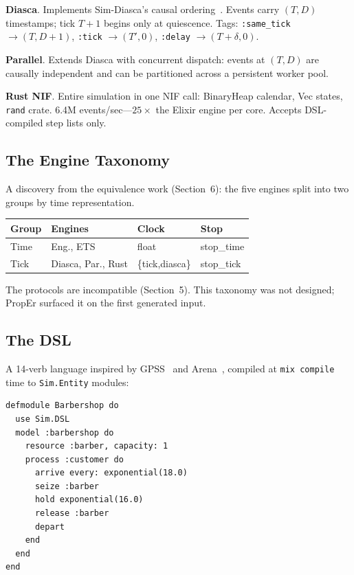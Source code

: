 \documentclass[sigplan,review,anonymous=false]{acmart}
\begin{document}
\textbf{Diasca}. Implements Sim-Diasca's causal ordering~\cite{boudeville2010}.
Events carry $(T, D)$ timestamps; tick $T{+}1$ begins only at
quiescence. Tags: \texttt{:same\_tick} ${\to}(T,D{+}1)$,
\texttt{:tick} ${\to}(T',0)$, \texttt{:delay} ${\to}(T{+}\delta,0)$.

\textbf{Parallel}. Extends Diasca with concurrent dispatch: events at
$(T, D)$ are causally independent and can be partitioned across a
persistent worker pool.

\textbf{Rust NIF}. Entire simulation in one NIF call: BinaryHeap
calendar, Vec states, \texttt{rand} crate. 6.4M events/sec---$25\times$
the Elixir engine per core. Accepts DSL-compiled step lists only.

\subsection{The Engine Taxonomy}

A discovery from the equivalence work (Section~6): the five engines
split into two groups by time representation.

\begin{table}[h]
\footnotesize
\begin{tabular}{@{}llll@{}}
\toprule
Group & Engines & Clock & Stop \\
\midrule
Time & Eng., ETS & float & stop\_time \\
Tick & Diasca, Par., Rust & \{tick,diasca\} & stop\_tick \\
\bottomrule
\end{tabular}
\end{table}

The protocols are incompatible (Section~5). This taxonomy was not
designed; PropEr surfaced it on the first generated input.

\subsection{The DSL}

A 14-verb language inspired by GPSS~\cite{gordon1961} and
Arena~\cite{kelton2015}, compiled at \texttt{mix compile} time to
\texttt{Sim.Entity} modules:

\begin{lstlisting}
defmodule Barbershop do
  use Sim.DSL
  model :barbershop do
    resource :barber, capacity: 1
    process :customer do
      arrive every: exponential(18.0)
      seize :barber
      hold exponential(16.0)
      release :barber
      depart
    end
  end
end
\end{lstlisting}
\end{document}
